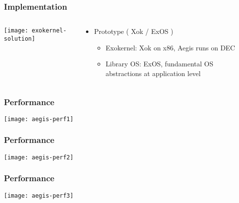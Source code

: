 \begin{frame}[plain]
	\frametitle{Implementation}
	

	
	\begin{columns}
		
		\begin{column}{.5\textwidth}
			
			\texttt{[image: exokernel-solution]}
			
		\end{column}
		
		\begin{column}{.5\textwidth}
			
			\large
			\begin{itemize}
				\item Prototype ( Xok / ExOS )
				\begin{itemize}
					\item Exokernel: Xok on x86, Aegis runs on DEC
					\item Library OS: ExOS, fundamental OS abstractions at application level
					
				\end{itemize}
				
			\end{itemize}
		\end{column}
		
		
	\end{columns}
	
\end{frame}



\begin{frame}[plain]
	\frametitle{Performance}
	
	\centering
	\texttt{[image: aegis-perf1]}
	
\end{frame}



\begin{frame}[plain]
	\frametitle{Performance}
	
	\centering
	\texttt{[image: aegis-perf2]}
	
\end{frame}


\begin{frame}[plain]
	\frametitle{Performance}
	
	\centering
	\texttt{[image: aegis-perf3]}
	
\end{frame}


